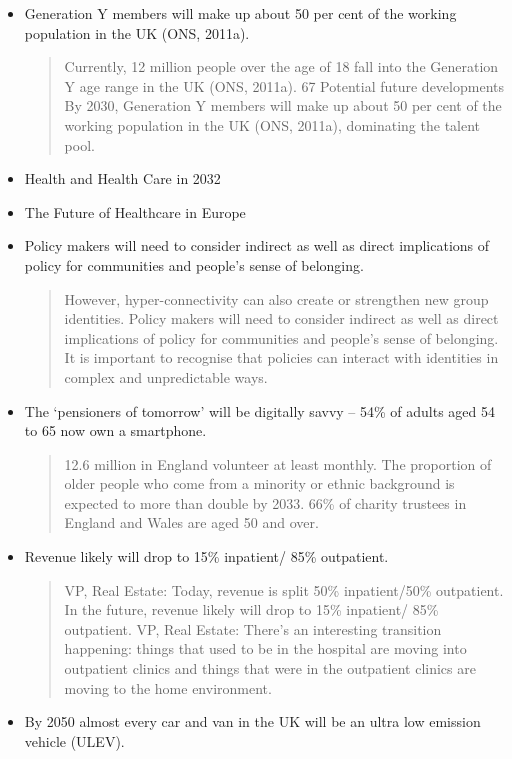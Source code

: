 \begin{itemize}
\item Generation Y members will make up about 50 per cent of the working population in the UK (ONS, 2011a).
\begin{quotation}
Currently, 12 million people over the age of 18 fall into the Generation Y age range in the UK (ONS, 2011a). 67 Potential future developments By 2030, Generation Y members will make up about 50 per cent of the working population in the UK (ONS, 2011a), dominating the talent pool.\end{quotation}
\item Health and Health Care in 2032
\item The Future of Healthcare  in Europe
\item Policy makers will need to consider indirect as well as direct implications of policy for communities and people's sense of belonging.
\begin{quotation}
However, hyper-connectivity can also create or strengthen new group identities. Policy makers will need to consider indirect as well as direct implications of policy for communities and people's sense of belonging. It is important to recognise that policies can interact with identities in complex and unpredictable ways.\end{quotation}
\item The `pensioners of tomorrow' will be digitally savvy -- 54\% of adults aged 54 to 65 now own a smartphone.
\begin{quotation}
12.6 million in England volunteer at least monthly. The proportion of older people who come from a minority or ethnic background is expected to more than double by 2033. 66\% of charity trustees in England and Wales are aged 50 and over.\end{quotation}
\item Revenue likely will drop to 15\% inpatient/ 85\% outpatient.
\begin{quotation}
VP, Real Estate: Today, revenue is split 50\% inpatient/50\% outpatient. In the future, revenue likely will drop to 15\% inpatient/ 85\% outpatient. VP, Real Estate: There's an interesting transition happening: things that used to be in the hospital are moving into outpatient clinics and things that were in the outpatient clinics are moving to the home environment.\end{quotation}
\item By 2050 almost every car and van in the UK will be an ultra low emission vehicle (ULEV).
\begin{quotation}

\end{quotation}
\end{itemize}

